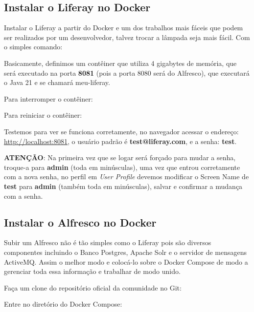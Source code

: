 \documentclass[a4paper,11pt]{article}
\begin{document}
\subsection{Instalar o Liferay no Docker}
Instalar o Liferay a partir do Docker e um dos trabalhos mais fáceis que podem ser realizados por um desenvolvedor, talvez trocar a lâmpada seja mais fácil. Com o simples comando: \\

Basicamente, definimos um contêiner que utiliza 4 gigabytes de memória, que será executado na porta \textbf{8081} (pois a porta 8080 será do Alfresco), que executará o Java 21 e se chamará meu-liferay.

Para interromper o contêiner: \\

Para reiniciar o contêiner: \\

Testemos para ver se funciona corretamente, no navegador acessar o endereço: \url{http://localhost:8081}, o usuário padrão é \textbf{test@liferay.com}, e a senha: \textbf{test}.

\textbf{ATENÇÃO}: Na primeira vez que se logar será forçado para mudar a senha, troque-a para \textbf{admin} (toda em minúsculas), uma vez que entrou corretamente com a nova senha, no perfil em \textit{User Profile} devemos modificar o Screen Name de \textbf{test} para \textbf{admin} (também toda em minúsculas), salvar e confirmar a mudança com a senha.

\subsection{Instalar o Alfresco no Docker}
Subir um Alfresco não é tão simples como o Liferay pois são diversos componentes incluindo o Banco Postgres, Apache Solr e o servidor de mensagens ActiveMQ. Assim o melhor modo e colocá-lo sobre o Docker Compose de modo a gerenciar toda essa informação e trabalhar de modo unido.

Faça um clone do repositório oficial da comunidade no Git: \\

Entre no diretório do Docker Compose: \\
\end{document}
